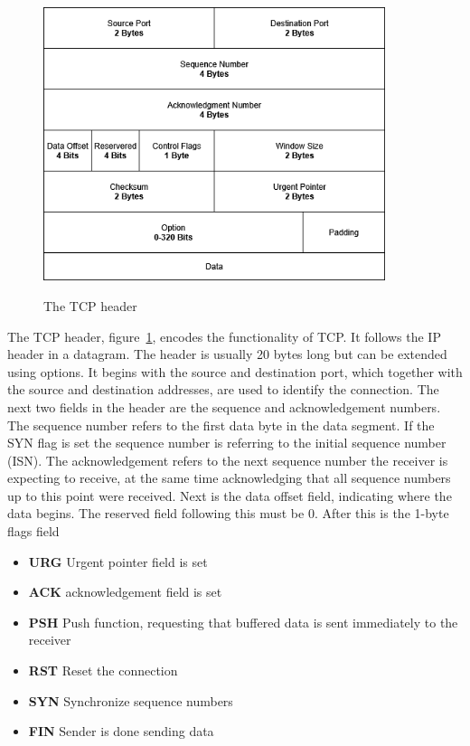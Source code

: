 \documentclass[english, 12pt, a4paper, elec, utf8, a-2b, online]{aaltothesis}
\begin{document}
\begin{figure}[t]
	\centering
	\includegraphics[alt={A block diagram of the TCP header format, detailing its fields and their sizes.}, height=8cm]{./images/tcp_header.png}
	\caption{The TCP header}
	\label{fig:tcp_header}
\end{figure}
The TCP header, figure~\ref{fig:tcp_header}, encodes the functionality of TCP.
It follows the IP header in a datagram. The header is usually 20 bytes long but
can be extended using options. It begins with the source and destination port, which
together with the source and destination addresses, are used to identify the connection.
The next two fields in the header are the sequence and acknowledgement numbers. The
sequence number refers to the first data byte in the data segment.
If the SYN flag is set the sequence number is referring to the initial sequence number
(ISN). The acknowledgement refers to the next sequence number the receiver is
expecting to receive, at the same time acknowledging that all sequence numbers
up to this point were received. Next is the data offset field, indicating where
the data begins. The reserved field following this must be 0. After this is the
1-byte flags field
\begin{itemize}
	\item \textbf{URG} Urgent pointer field is set
	\item \textbf{ACK} acknowledgement field is set
	\item \textbf{PSH} Push function, requesting that buffered data is sent immediately to the receiver
	\item \textbf{RST} Reset the connection
	\item \textbf{SYN} Synchronize sequence numbers
	\item \textbf{FIN} Sender is done sending data
\end{itemize}
\end{document}
